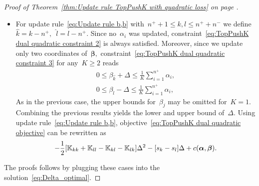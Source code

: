 \begin{proof}[Proof of Theorem~\ref{thm:Update rule TopPushK with quadratic loss} on page \pageref{thm:Update rule TopPushK with quadratic loss}]
\begin{itemize}
    \item For update rule~\eqref{eq:Update rule b,b} with~$n^+ + 1\le k,l \le n^+ + n^-$ we define~$\hat{k} = k - n^+,$~$\hat{l} = l - n^+.$ Since no~$\alpha_i$ was updated, constraint~\eqref{eq:TopPushK dual quadratic constraint 2} is always satisfied. Moreover, since we update only two coordinates of~$\bm{\beta},$ constraint~\eqref{eq:TopPushK dual quadratic constraint 3} for any~$K \geq 2$ reads
    \begin{equation}\label{eq: TopPushK dual quadratic b,b - bounds}
      \begin{aligned}
        0 \leq \beta_{\hat{k}} + \Delta \leq \frac{1}{K} \sum_{i = 1}^{n^+} \alpha_i, \\
        0 \leq \beta_{\hat{l}} - \Delta \leq \frac{1}{K} \sum_{i = 1}^{n^+} \alpha_i,
      \end{aligned}
    \end{equation}
    As in the previous case, the upper bounds for~$\beta_j$ may be omitted for~$K = 1$. Combining the previous results yields the lower and upper bound of~$\Delta.$ Using update rule~\eqref{eq:Update rule b,b}, objective~\eqref{eq:TopPushK dual quadratic objective} can be rewritten as
    \begin{equation*}
      - \frac{1}{2} \Brac[s]{\K_{kk} + \K_{ll} - \K_{kl} - \K_{lk}} \Delta^2 - \Brac[s]{s_k - s_l} \Delta + c(\bm{\alpha}, \bm{\beta}).
    \end{equation*}
  \end{itemize}
  The proofs follows by plugging these cases into the solution~\eqref{eq:Delta_optimal}.
\end{proof}


\subsection{\PatMat}

